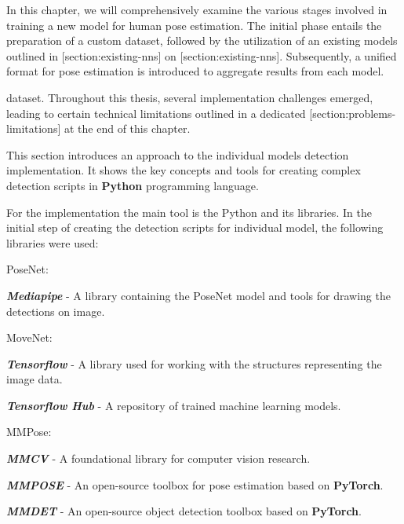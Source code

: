 In this chapter, we will comprehensively examine the various stages involved in training a new model for human pose estimation. The initial phase entails the preparation of a custom dataset, followed by the utilization of an existing models outlined in [section:existing-nns] on [section:existing-nns]. Subsequently, a unified format for pose estimation is introduced to aggregate results from each model.

dataset. Throughout this thesis, several implementation challenges emerged, leading to certain technical limitations outlined in a dedicated [section:problems-limitations] at the end of this chapter.

This section introduces an approach to the individual models detection implementation. It shows the key concepts and tools for creating complex detection scripts in {\bf Python} programming language.

For the implementation the main tool is the Python and its libraries. In the initial step of creating the detection scripts for individual model, the following libraries were used:

\startitemize[n]
    \item PoseNet:
        \startitemize[1]
            \item {\bf {\em Mediapipe}} - A library containing the PoseNet model and tools for drawing the detections on image.
        \stopitemize
    \item MoveNet:
        \startitemize[1]
            \item {\bf {\em Tensorflow}} - A library used for working with the structures representing the image data.
            \item {\bf {\em Tensorflow Hub}} - A repository of trained machine learning models.
        \stopitemize
    \item MMPose:
        \startitemize[1]
            \item {\bf {\em MMCV}} - A foundational library for computer vision research.
            \item {\bf {\em MMPOSE}} - An open-source toolbox for pose estimation based on {\bf PyTorch}.
            \item {\bf {\em MMDET}} - An open-source object detection toolbox based on {\bf PyTorch}.
        \stopitemize
\stopitemize

